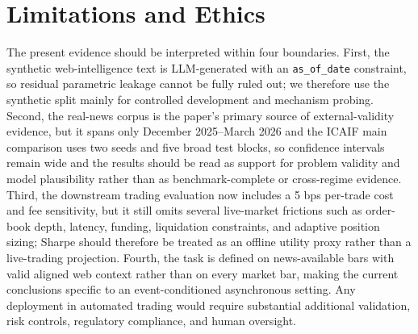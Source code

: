 \section{Limitations and Ethics}
\label{sec:limitations}

The present evidence should be interpreted within four boundaries. First, the synthetic web-intelligence text is LLM-generated with an \texttt{as\_of\_date} constraint, so residual parametric leakage cannot be fully ruled out; we therefore use the synthetic split mainly for controlled development and mechanism probing. Second, the real-news corpus is the paper's primary source of external-validity evidence, but it spans only December 2025--March 2026 and the ICAIF main comparison uses two seeds and five broad test blocks, so confidence intervals remain wide and the results should be read as support for problem validity and model plausibility rather than as benchmark-complete or cross-regime evidence. Third, the downstream trading evaluation now includes a 5 bps per-trade cost and fee sensitivity, but it still omits several live-market frictions such as order-book depth, latency, funding, liquidation constraints, and adaptive position sizing; Sharpe should therefore be treated as an offline utility proxy rather than a live-trading projection. Fourth, the task is defined on news-available bars with valid aligned web context rather than on every market bar, making the current conclusions specific to an event-conditioned asynchronous setting. Any deployment in automated trading would require substantial additional validation, risk controls, regulatory compliance, and human oversight.
